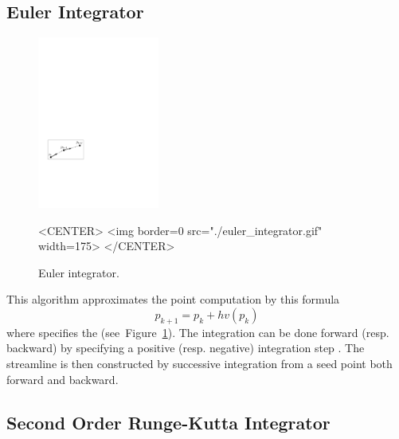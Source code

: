 \subsection{Euler Integrator}

\begin{figure}[h!]
\begin{ccTexOnly}
\begin{center}
\includegraphics[width=4cm]{Stream_lines_2/euler_integrator}
\end{center}
\end{ccTexOnly}
\begin{ccHtmlOnly}
<CENTER>
<img border=0 src="./euler_integrator.gif" width=175>
</CENTER>
\end{ccHtmlOnly}
\begin{center}
\caption{Euler integrator.
\label{euler_fig}}
\end{center}
\end{figure}

This algorithm approximates the point computation by this formula
$$p_{k+1} = p_k + hv(p_k)$$ where  specifies the
 (see~Figure~\ref{euler_fig}). The integration
can be done forward (resp. backward) by specifying a positive
(resp. negative) integration step . The streamline is then
constructed by successive integration from a seed point both forward
and backward.

\subsection{Second Order Runge-Kutta Integrator}

